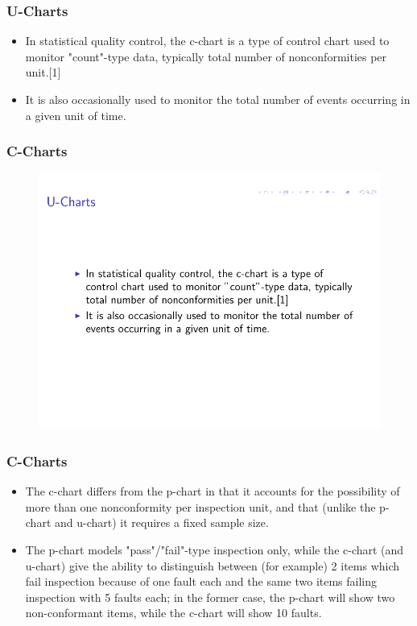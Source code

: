 \documentclass[Charts101.tex]{subfiles}
\begin{document}
\begin{frame}
\frametitle{U-Charts}	
\large
\begin{itemize}
\item In statistical quality control, the c-chart is a type of control chart used to monitor "count"-type data, typically total number of nonconformities per unit.[1] 
\item It is also occasionally used to monitor the total number of events occurring in a given unit of time.
\end{itemize}

\end{frame}
\begin{frame}
	\frametitle{C-Charts}
	\Large
	
	\begin{figure}
\centering
\includegraphics[width=1.0\linewidth]{C-chart}

\end{figure}

\end{frame}
\begin{frame}
\frametitle{C-Charts}
\Large
\begin{itemize}
\item The c-chart differs from the p-chart in that it accounts for the possibility of more than one nonconformity per inspection unit, and that (unlike the p-chart and u-chart) it requires a fixed sample size. 
\item The p-chart models "pass"/"fail"-type inspection only, while the c-chart (and u-chart) give the ability to distinguish between (for example) 2 items which fail inspection because of one fault each and the same two items failing inspection with 5 faults each; in the former case, the p-chart will show two non-conformant items, while the c-chart will show 10 faults.
\end{itemize}


\end{frame}
\end{document}
